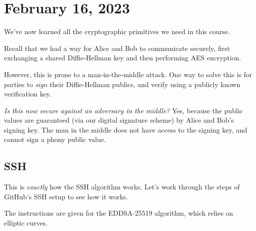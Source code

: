 \section{February 16, 2023}
\label{20230216}

We've now learned all the cryptographic primitives we need in this course.

Recall that we had a way for Alice and Bob to communicate securely, first exchanging a shared Diffie-Hellman key and then performing AES encryption.


However, this is prone to a man-in-the-middle attack. One way to solve this is for parties to \emph{sign} their Diffie-Hellman publics, and verify using a publicly known verification key.


\emph{Is this now secure against an adversary in the middle?} Yes, because the public values are guaranteed (via our digital signature scheme) by Alice and Bob's signing key. The man in the middle does not have access to the signing key, and cannot sign a phony public value.

\subsection{SSH}

This is \emph{exactly} how the SSH algorithm works. Let's work through the steps of GitHub's SSH setup to see how it works.


The instructions are given for the EDDSA-25519 algorithm, which relies on elliptic curves.

